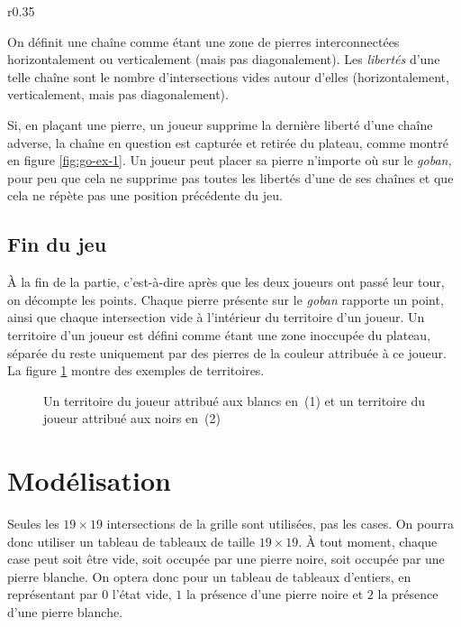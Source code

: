 \begin{wrapfigure}[12]{r}{0.35\linewidth}
    \centering
    
    \caption{La chaîne blanche sera capturée par la pose d'une pierre noire en~(1)}
    \label{fig:go-ex-1}
\end{wrapfigure}

On définit une chaîne comme étant une zone de pierres
interconnectées horizontalement ou verticalement (mais pas
diagonalement). Les \emph{libertés} d'une telle chaîne
sont le nombre d'intersections vides autour d'elles (horizontalement,
verticalement, mais pas diagonalement).

Si, en plaçant une pierre, un joueur supprime la dernière
liberté d'une chaîne adverse, la chaîne en question est capturée
et retirée du plateau, comme montré en figure \ref{fig:go-ex-1}.
Un joueur peut placer sa pierre n'importe où sur le
\emph{goban,} pour peu que cela ne supprime pas toutes les libertés
d'une de ses chaînes et que cela ne répète pas une position précédente du jeu.

\subsection{Fin du jeu}

À la fin de la partie, c'est-à-dire après que les deux joueurs
ont passé leur tour, on décompte les points. Chaque pierre
présente sur le \emph{goban} rapporte un point, ainsi que chaque
intersection vide à l'intérieur du territoire d'un joueur.
Un territoire d'un joueur est défini comme étant une zone inoccupée du plateau,
séparée du reste uniquement par des pierres de la couleur attribuée à ce joueur.
La figure \ref{fig:go-ex-2} montre des exemples de territoires.

\begin{figure}[h!]
    \centering
    
    \caption{Un territoire du joueur attribué aux blancs en~(1) et un territoire du joueur attribué aux noirs en~(2)}
    \label{fig:go-ex-2}
\end{figure}

\section{Modélisation}

Seules les $19 \times 19$ intersections de la grille sont utilisées,
pas les cases. On pourra donc utiliser un tableau de tableaux de taille
$19 \times 19.$ À tout moment, chaque case peut soit être vide, soit
occupée par une pierre noire, soit occupée par une pierre blanche.
On optera donc pour un tableau de tableaux d'entiers, en représentant
par $0$ l'état vide, $1$ la présence d'une pierre noire et $2$ la
présence d'une pierre blanche.

